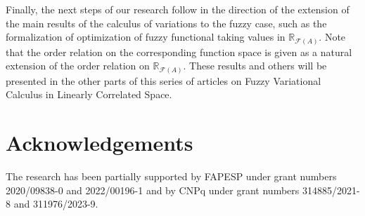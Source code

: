 \documentclass[12pt,a4paper]{article}
\newcommand{\RFA}{\mathbb{R}_{\mathcal{F}(A)}}
\begin{document}
Finally, the next steps of our research follow in the direction of the extension of the main results of the calculus of variations to the fuzzy case, such as the formalization of optimization of fuzzy functional taking values in $\RFA$. Note that the order relation on the corresponding function space is given as a natural extension of the order relation on $\RFA$. These results and others will be presented in the other parts of this series of articles on Fuzzy Variational Calculus in Linearly Correlated Space. 






\section*{Acknowledgements}

The research has been partially supported by FAPESP under grant numbers 2020/09838-0 and 2022/00196-1 and by CNPq under grant numbers 314885/2021-8 and 311976/2023-9.

%
%
\end{document}
